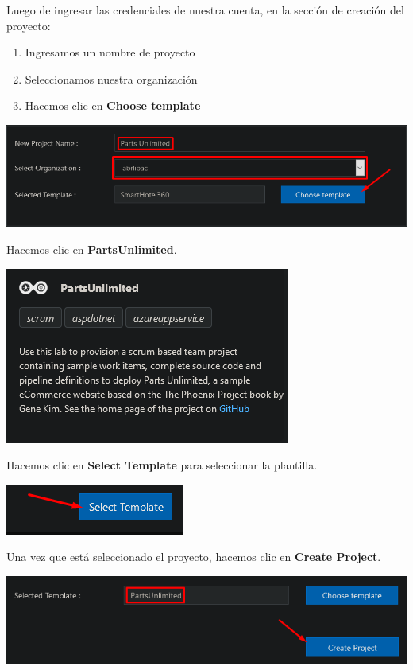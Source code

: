 \documentclass{elsarticle}
\begin{document}
Luego de ingresar las credenciales de nuestra cuenta, en la sección de creación del proyecto:

\begin{enumerate}
    \item Ingresamos un nombre de proyecto
    \item Seleccionamos nuestra organización
    \item Hacemos clic en \textbf{Choose template}
\end{enumerate}

\begin{center}
	\includegraphics[width=\columnwidth]{img/Screenshot_10.png}
\end{center}

Hacemos clic en \textbf{PartsUnlimited}.
\begin{center}
	\includegraphics{img/Screenshot_11.png}
\end{center}

Hacemos clic en \textbf{Select Template} para seleccionar la plantilla.
\begin{center}
	\includegraphics{img/Screenshot_12.png}
\end{center}

Una vez que está seleccionado el proyecto, hacemos clic en \textbf{Create Project}.
\begin{center}
	\includegraphics[width=\columnwidth]{img/Screenshot_13.png}
\end{center}
\end{document}
